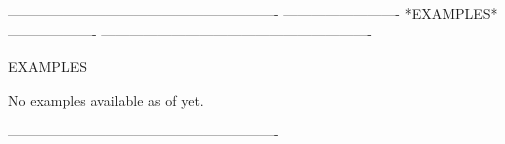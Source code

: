  
 
 
 
 
 
 
 
 
 
 
 
 
 
 
 
 
 
 
 
 
 
 
 
 
 
 
 
 
 
 
 
 
 
 
 
 
 
 
 
 
 
 
 
 
 
 
 
 
 
 
 
 
 
 
 
 
 
 
 
 
 
 
 
 
 
 
 
 
 
 
----------------------------------------------------------
-------------------------  *EXAMPLES*  -------------------
----------------------------------------------------------
 
EXAMPLES
 
No examples available as of yet.
 
----------------------------------------------------------
 
 
 
 
 
 
 
 
 
 
 
 
 
 
 
 
 
 
 
 
 
 
 
 
 
 
 
 
 
